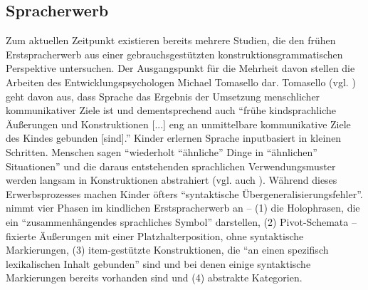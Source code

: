 


\subsection{Spracherwerb}
Zum aktuellen Zeitpunkt existieren bereits mehrere Studien, die den frühen Erstspracherwerb aus einer gebrauchsgestützten konstruktionsgrammatischen Perspektive untersuchen.
Der Ausgangspunkt für die Mehrheit davon stellen die Arbeiten des Entwicklungspsychologen Michael Tomasello dar.
Tomasello (vgl. \cite{Tomasello06}) geht davon aus, dass Sprache das Ergebnis der Umsetzung menschlicher kommunikativer Ziele ist
und dementsprechend auch ``frühe kindsprachliche Äußerungen und Konstruktionen [...] eng an unmittelbare kommunikative Ziele des Kindes gebunden [sind].''
Kinder erlernen Sprache inputbasiert in kleinen Schritten.
Menschen sagen ``wiederholt ``ähnliche'' Dinge in ``ähnlichen'' Situationen'' \cite{Tomasello06} und die daraus entstehenden sprachlichen Verwendungsmuster werden langsam in Konstruktionen abstrahiert (vgl. auch \cite{Ellis08}).
Während dieses Erwerbsprozesses machen Kinder öfters ``syntaktische Übergeneralisierungsfehler''.%
\cite{Tomasello06} nimmt vier Phasen im kindlichen Erstspracherwerb an --
(1) die Holophrasen, die ein ``zusammenhängendes sprachliches Symbol'' darstellen,
(2) Pivot-Schemata -- fixierte Äußerungen mit einer Platzhalterposition, ohne syntaktische Markierungen,
(3) item-gestützte Konstruktionen, die ``an einen spezifisch lexikalischen Inhalt gebunden'' sind und bei denen einige syntaktische Markierungen bereits vorhanden sind
und (4) abstrakte Kategorien.



